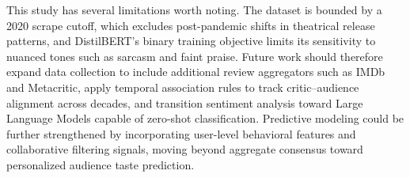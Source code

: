 \documentclass[conference]{IEEEtran}
\begin{document}
This study has several limitations worth noting. The dataset is bounded by a 2020 scrape cutoff, which excludes post-pandemic shifts in theatrical release patterns, and DistilBERT's binary training objective limits its sensitivity to nuanced tones such as sarcasm and faint praise. Future work should therefore expand data collection to include additional review aggregators such as IMDb and Metacritic, apply temporal association rules to track critic--audience alignment across decades, and transition sentiment analysis toward Large Language Models capable of zero-shot classification. Predictive modeling could be further strengthened by incorporating user-level behavioral features and collaborative filtering signals, moving beyond aggregate consensus toward personalized audience taste prediction.



\end{document}
